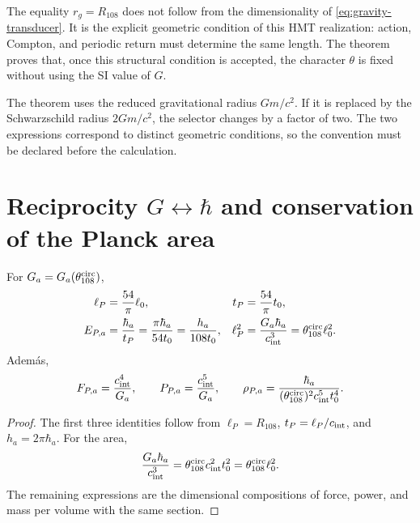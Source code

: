 The equality \(r_g=R_{108}\) does not follow from the dimensionality of \cref{eq:gravity-transducer}. It is the explicit geometric condition of this HMT realization: action, Compton, and periodic return must determine the same length. The theorem proves that, once this structural condition is accepted, the character \(\theta\) is fixed without using the SI value of \(G\).

\begin{remark}
The theorem uses the reduced gravitational radius \(Gm/c^2\). If it is replaced
by the Schwarzschild radius \(2Gm/c^2\), the selector changes by a factor of
two. The two expressions correspond to distinct geometric conditions,
so the convention must be declared before the calculation.
\end{remark}

\section{Reciprocity \(G\leftrightarrow\hbar\) and conservation of the Planck area}

\begin{corollary}
\label{cor:gravity-planck-family}
For \(G_a=G_a(\theta_{108}^{\rm circ})\),
\begin{align}
\ell_P&=\frac{54}{\pi}\ell_0,
&t_P&=\frac{54}{\pi}t_0,
\label{eq:gravity-planck-length-time}\\
E_{P,a}&=\frac{\hbar_a}{t_P}
=\frac{\pi\hbar_a}{54t_0}
=\frac{h_a}{108t_0},
&\ell_P^2&=\frac{G_a\hbar_a}{c_{\rm int}^3}
=\theta_{108}^{\rm circ}\ell_0^2.
\label{eq:gravity-planck-energy-area}
\end{align}
Adem\'as,
\begin{equation}
\label{eq:gravity-planck-force-power-density}
F_{P,a}=\frac{c_{\rm int}^4}{G_a},
\qquad
P_{P,a}=\frac{c_{\rm int}^5}{G_a},
\qquad
\rho_{P,a}=\frac{\hbar_a}
{(\theta_{108}^{\rm circ})^2c_{\rm int}^5t_0^4}.
\end{equation}
\end{corollary}

\begin{proof}
The first three identities follow from
\(\ell_P=R_{108}\), \(t_P=\ell_P/c_{\rm int}\), and
\(h_a=2\pi\hbar_a\). For the area,
\[
\frac{G_a\hbar_a}{c_{\rm int}^3}
=\theta_{108}^{\rm circ}c_{\rm int}^2t_0^2
=\theta_{108}^{\rm circ}\ell_0^2.
\]
The remaining expressions are the dimensional compositions of force,
power, and mass per volume with the same section.
\end{proof}

